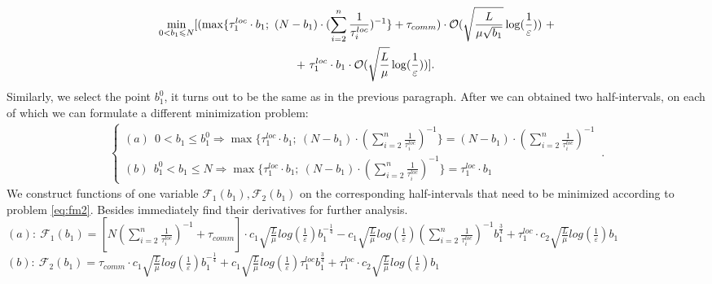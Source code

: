 \documentclass{article}
\theoremstyle{definition}
\theoremstyle{plain}
\begin{document}
\begin{eqnarray}
    \begin{split}
    \label{eq:fm2}
        \underset{0 < b_1 \leq N}{\min}[(\max\{\tau_1^{loc}\cdot b_1; ~(N-b_1) \cdot (\sum\limits_{i = 2}^{n} \frac{1}{\tau_i^{loc}} )^{-1}\} + \tau_{comm}) \cdot \mathcal O(\sqrt{\frac{L}{\mu \sqrt{b_1}}}\log(\frac{1}{\varepsilon})) ~+
        \\ + ~
        \tau_1^{loc}\cdot b_1 \cdot \mathcal O(\sqrt{\frac{L}{\mu}}\log(\frac{1}{\varepsilon}))]. \hspace{3.7cm}
    \end{split}
\end{eqnarray}
Similarly, we select the point $b_1^0$, it turns out to be the same as in the previous paragraph. After we can obtained two half-intervals, on each of which we can formulate a different minimization problem:
\begin{eqnarray}
\label{half-int}
    \begin{cases}
    (a) ~ ~ 0 < b_1 \leq b_1^0 \Rightarrow \max\{\tau_1^{loc}\cdot b_1; ~(N-b_1) \cdot (\sum\limits_{i = 2}^{n} \frac{1}{\tau_i^{loc}} )^{-1}\} = 
    (N-b_1) \cdot (\sum\limits_{i = 2}^{n} \frac{1}{\tau_i^{loc}})^{-1}
    \\
    (b) ~ ~ b_1^0 <  b_1 \leq N \Rightarrow \max\{\tau_1^{loc}\cdot b_1; ~(N-b_1) \cdot (\sum\limits_{i = 2}^{n} \frac{1}{\tau_i^{loc}} )^{-1}\} = \tau_1^{loc}\cdot b_1
    \end{cases}\,.
\end{eqnarray}
We construct functions of one variable $\mathcal{F}_1(b_1), \mathcal{F}_2(b_1)$ on the corresponding half-intervals that need to be minimized according to problem \eqref{eq:fm2}. Besides immediately find their derivatives for further analysis.\\
$(a): ~\mathcal{F}_1(b_1) = [N (\sum\limits_{i = 2}^{n} \frac{1}{\tau_i^{loc}})^{-1} + \tau_{comm}]\cdot 
c_1 \sqrt{\frac{L}{\mu}}log (\frac{1}{\varepsilon})  b_1^{-\frac{1}{4}} - 
c_1  \sqrt{\frac{L}{\mu}}log (\frac{1}{\varepsilon})(\sum\limits_{i =
2}^{n} \frac{1}{\tau_i^{loc}})^{-1} b_1^{\frac{3}{4}}  + \tau_1^{loc}\cdot c_2  \sqrt{\frac{L}{\mu}}log (\frac{1}{\varepsilon}) b_1 $\\
$(b): ~\mathcal{F}_2(b_1) = \tau_{comm}\cdot 
c_1 \sqrt{\frac{L}{\mu}}log (\frac{1}{\varepsilon})  b_1^{-\frac{1}{4}} + 
c_1  \sqrt{\frac{L}{\mu}}log (\frac{1}{\varepsilon})\tau_1^{loc} b_1^{\frac{3}{4}}  + \tau_1^{loc}\cdot c_2  \sqrt{\frac{L}{\mu}}log (\frac{1}{\varepsilon}) b_1 $
\\
\end{document}
